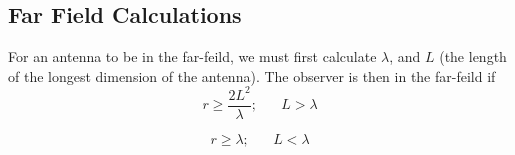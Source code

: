 \subsection{Far Field Calculations}
For an antenna to be in the far-feild, we must first calculate $\lambda$, and $L$ (the length of the longest dimension of the antenna). The observer is then in the far-feild if
\begin{equation}
    r \geq \frac{2L^2}{\lambda};\;\;\;\;\;\; L>\lambda
\end{equation}

\begin{equation}
    r \geq \lambda;\;\;\;\;\;\; L<\lambda
\end{equation}


